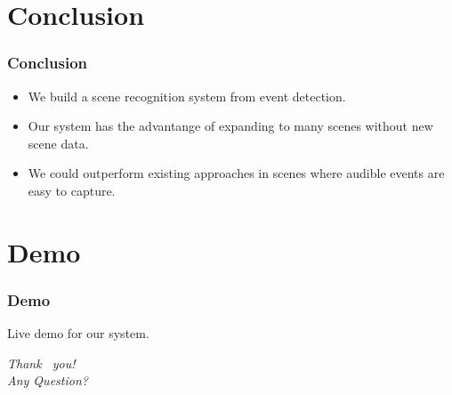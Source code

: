 \documentclass[xcolor=table,slidestop,compress,mathserif]{beamer}
\begin{document}
\section{Conclusion}
\begin{frame}
	\frametitle{Conclusion}
	\begin{itemize}
		\item{We build a scene recognition system from event detection.\\}
		\item{Our system has the advantange of expanding to many scenes without new scene data.\\}
		\item{We could outperform existing approaches in scenes where audible events are easy to capture.\\}
	\end{itemize}
\end{frame}
\section{Demo}
\begin{frame}
	\frametitle{Demo}
	Live demo for our system. 
\end{frame}
\begin{frame}
  \begin{center}
    {\huge \emph{{Thank  ~you!
          \\   \vspace{1cm} Any Question?}}}
  \end{center}
\end{frame}
\end{document}
